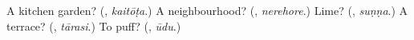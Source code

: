 \begin{tcolorbox}[breakable,colback=teal!4,colframe=teal!35!black,title={Before you move on}]
A kitchen garden? (\textbf{}, \emph{kaitōṭa}.) A neighbourhood? (\textbf{}, \emph{nerehore}.) Lime? (\textbf{}, \emph{suṇṇa}.) A terrace? (\textbf{}, \emph{tārasi}.) To puff? (\textbf{}, \emph{ūdu}.)
\end{tcolorbox}
